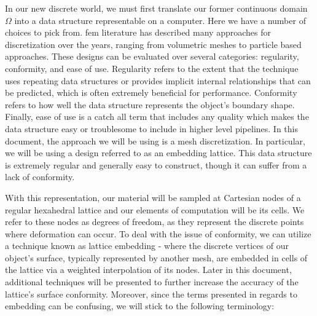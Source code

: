 In our new discrete world, we must first translate our former
continuous domain $\Omega$ into a data structure representable on a
computer. Here we have a number of choices to pick from. \gls{fem}
literature has described many approaches for discretization over the
years, ranging from volumetric meshes to particle based
approaches. These designs can be evaluated over several categories:
regularity, conformity, and ease of use. Regularity refers to the
extent that the technique uses repeating data structures or provides
implicit internal relationships that can be predicted, which is often
extremely beneficial for performance. Conformity refers to how well
the data structure represents the object's boundary shape. Finally,
ease of use is a catch all term that includes any quality which makes
the data structure easy or troublesome to include in higher level
pipelines. In this document, the approach we will be using is a mesh
discretization. In particular, we will be using a design referred to
as an embedding lattice. This data structure is extremely regular and
generally easy to construct, though it can suffer from a lack of
conformity. 

With this representation, our material will be sampled at Cartesian
nodes of a regular hexahedral lattice and our elements of computation
will be its cells. We refer to these nodes as degrees of freedom, as
they represent the discrete points where deformation can occur. To
deal with the issue of conformity, we can utilize a technique known as
lattice embedding - where the discrete vertices of our object's
surface, typically represented by another mesh, are embedded in cells
of the lattice via a weighted interpolation of its nodes. Later in
this document, additional techniques will be presented to further
increase the accuracy of the lattice's surface conformity. Moreover,
since the terms presented in regards to embedding can be confusing, we
will stick to the following terminology:


